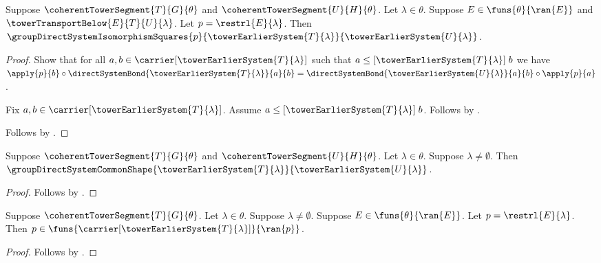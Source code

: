 \begin{proposition}\label{tower_transport_restriction_squares}
    Suppose $\coherentTowerSegment{T}{G}{\theta}$ and
        $\coherentTowerSegment{U}{H}{\theta}$.
    Let $\lambda\in\theta$.
    Suppose $E\in\funs{\theta}{\ran{E}}$ and
        $\towerTransportBelow{E}{T}{U}{\lambda}$.
    Let $p=\restrl{E}{\lambda}$.
    Then $\groupDirectSystemIsomorphismSquares{p}
        {\towerEarlierSystem{T}{\lambda}}
        {\towerEarlierSystem{U}{\lambda}}$.
\end{proposition}
\begin{proof}
    Show that for all
        $a,b\in\carrier[\towerEarlierSystem{T}{\lambda}]$ such that
        $a\mathrel{\leq[\towerEarlierSystem{T}{\lambda}]}b$ we have
        $\apply{p}{b}\circ
            \directSystemBond{\towerEarlierSystem{T}{\lambda}}{a}{b}=
        \directSystemBond{\towerEarlierSystem{U}{\lambda}}{a}{b}
            \circ\apply{p}{a}$.
    \begin{subproof}
        Fix $a,b\in\carrier[\towerEarlierSystem{T}{\lambda}]$.
        Assume $a\mathrel{
            \leq[\towerEarlierSystem{T}{\lambda}]}b$.
        Follows by .
    \end{subproof}
    Follows by .
\end{proof}

\begin{proposition}\label{tower_transport_earlier_system_common_shape}
    Suppose $\coherentTowerSegment{T}{G}{\theta}$ and
        $\coherentTowerSegment{U}{H}{\theta}$.
    Let $\lambda\in\theta$.
    Suppose $\lambda\neq\emptyset$.
    Then $\groupDirectSystemCommonShape
        {\towerEarlierSystem{T}{\lambda}}
        {\towerEarlierSystem{U}{\lambda}}$.
\end{proposition}
\begin{proof}
    Follows by
        .
\end{proof}

\begin{proposition}\label{tower_transport_restriction_system_type_under_segment}
    Suppose $\coherentTowerSegment{T}{G}{\theta}$.
    Let $\lambda\in\theta$.
    Suppose $\lambda\neq\emptyset$.
    Suppose $E\in\funs{\theta}{\ran{E}}$.
    Let $p=\restrl{E}{\lambda}$.
    Then $p\in\funs{
        \carrier[\towerEarlierSystem{T}{\lambda}]}{\ran{p}}$.
\end{proposition}
\begin{proof}
    Follows by
        .
\end{proof}


